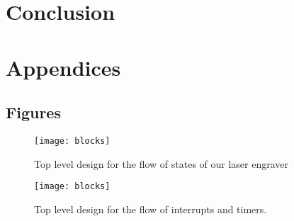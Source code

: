 \documentclass[11pt]{LaTeX-Classes/math-hw}
\begin{document}
\section*{Conclusion}


\section*{Appendices}
\subsection{Figures}
 \begin{figure}[H]
   \begin{center}
     \texttt{[image: blocks]}
     \caption{Top level design for the flow of states of our laser engraver}
     \label{fig:blockdiagram}
   \end{center}
 \end{figure}

\begin{figure}[H]
	   \begin{center}
	     \texttt{[image: blocks]}
	     \caption{Top level design for the flow of interrupts and timers.}
	     \label{fig:mcwiringdiagram}
	   \end{center}
	 \end{figure}
\end{document}
